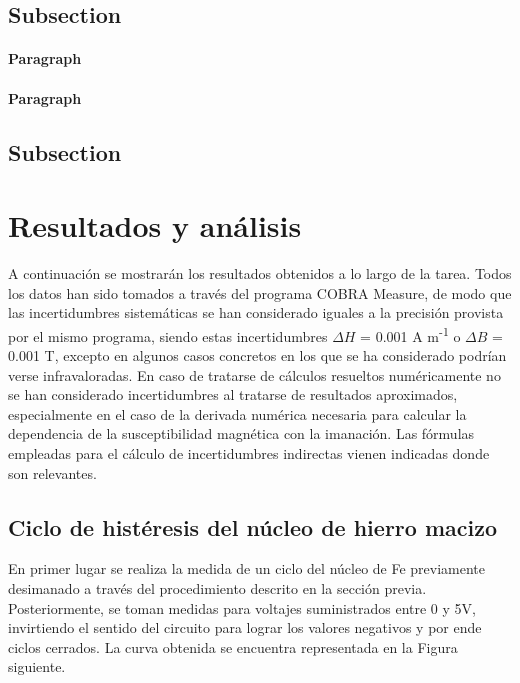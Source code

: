 \documentclass[fleqn,11pt]{SelfArx} %
\begin{document}
\subsection{Subsection}

\lipsum[6] %

\paragraph{Paragraph} \lipsum[7] %
\paragraph{Paragraph} \lipsum[8] %

\subsection{Subsection}

\lipsum[9] %



\section{Resultados y análisis}
A continuación se mostrarán los resultados obtenidos a lo largo de la tarea. Todos los datos han sido tomados a través del programa COBRA Measure, de modo que las incertidumbres sistemáticas se han considerado iguales a la precisión provista por el mismo programa, siendo estas incertidumbres $\Delta H$ = 0.001 A m\textsuperscript{-1} o $\Delta B$ = 0.001 T, excepto en algunos casos concretos en los que se ha considerado podrían verse infravaloradas. En caso de tratarse de cálculos resueltos numéricamente no se han considerado incertidumbres al tratarse de resultados aproximados, especialmente en el caso de la derivada numérica necesaria para calcular la dependencia de la susceptibilidad magnética con la imanación. Las fórmulas empleadas para el cálculo de incertidumbres indirectas vienen indicadas donde son relevantes. 

\subsection{Ciclo de histéresis del núcleo de hierro macizo}
En primer lugar se realiza la medida de un ciclo del núcleo de Fe previamente desimanado a través del procedimiento descrito en la sección previa. Posteriormente, se toman medidas para voltajes suministrados entre 0 y 5V, invirtiendo el sentido del circuito para lograr los valores negativos y por ende ciclos cerrados. La curva obtenida se encuentra representada en la Figura siguiente.
\end{document}
